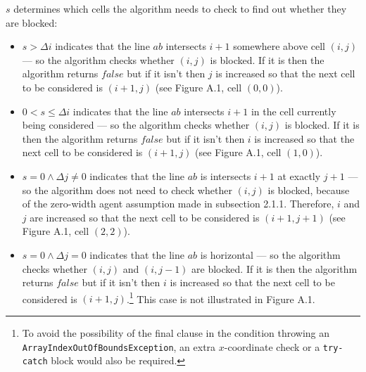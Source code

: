 \noindent
$s$ determines which cells the algorithm needs to check to find out whether they are blocked:
\begin{itemize}
\item $s > \Delta i$ indicates that the line $ab$ intersects $i+1$ somewhere above cell $(i,j)$ --- so the algorithm checks whether $(i,j)$ is blocked. If it is then the algorithm returns $false$ but if it isn't then $j$ is increased so that the next cell to be considered is $(i+1,j)$ (see Figure A.1, cell $(0,0)$).
\item $0 < s \leq \Delta i$ indicates that the line $ab$ intersects $i+1$ in the cell currently being considered --- so the algorithm checks whether $(i,j)$ is blocked. If it is then the algorithm returns $false$ but if it isn't then $i$ is increased so that the next cell to be considered is $(i+1,j)$ (see Figure A.1, cell $(1,0)$).
\item $s = 0 \land \Delta j \neq 0$ indicates that the line $ab$ is intersects $i+1$ at exactly $j+1$ --- so the algorithm does not need to check whether $(i,j)$ is blocked, because of the zero-width agent assumption made in subsection 2.1.1. Therefore, $i$ and $j$ are increased so that the next cell to be considered is $(i+1,j+1)$ (see Figure A.1, cell $(2,2)$).
\item $s = 0 \land \Delta j = 0$ indicates that the line $ab$ is horizontal --- so the algorithm checks whether $(i,j)$ and $(i,j-1)$ are blocked. If it is then the algorithm returns $false$ but if it isn't then $i$ is increased so that the next cell to be considered is $(i+1,j)$.\footnote{To avoid the possibility of the final clause in the condition throwing an {\tt ArrayIndexOutOfBoundsException}, an extra $x$-coordinate check or a {\tt try-catch} block would also be required.} This case is not illustrated in Figure A.1.
\end{itemize}

